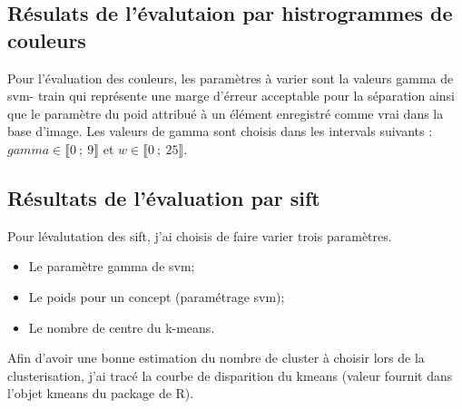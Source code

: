 \documentclass[a4paper, 11pt]{article}
\begin{document}
\subsection{Résulats de l'évalutaion par histrogrammes de couleurs}
\begin{center}
\end{center}

Pour l'évaluation des couleurs, les paramètres à varier sont la valeurs gamma de svm-
train qui représente une marge d'érreur acceptable pour la séparation ainsi que le paramètre du poid attribué à un élément enregistré comme vrai dans la base d'image. Les valeurs de gamma sont choisis dans les intervals suivants : $gamma \in \llbracket  0~;~9 \rrbracket$ et $w \in \llbracket  0~;~25 \rrbracket$. 

\subsection{Résultats de l'évaluation par sift}
Pour lévalutation des sift, j'ai choisis de faire varier trois paramètres. 
\begin{itemize}
	\item Le paramètre gamma de svm;
	\item Le poids pour un concept (paramétrage svm);
	\item Le nombre de centre du k-means.
\end{itemize}
Afin d'avoir une bonne estimation du nombre de cluster à choisir lors de la clusterisation, j'ai tracé la courbe de disparition du kmeans (valeur fournit dans l'objet kmeans du package de R). 
\end{document}
